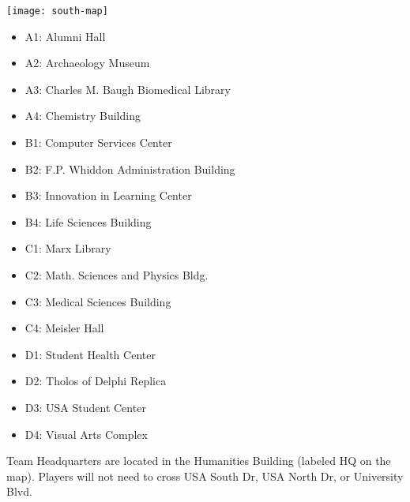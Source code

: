 \documentclass{../puzzlehunt}
\begin{document}


\begin{center}
  \texttt{[image: south-map]}
\end{center}

\begin{multicols}{2}
  \begin{itemize}
    \item A1: Alumni Hall
    \item A2: Archaeology Museum
    \item A3: Charles M. Baugh Biomedical Library
    \item A4: Chemistry Building
    \item B1: Computer Services Center
    \item B2: F.P. Whiddon Administration Building %
    \item B3: Innovation in Learning Center
    \item B4: Life Sciences Building
    \item C1: Marx Library
    \item C2: Math. Sciences and Physics Bldg. 
    \item C3: Medical Sciences Building
    \item C4: Meisler Hall %
    \item D1: Student Health Center
    \item D2: Tholos of Delphi Replica
    \item D3: USA Student Center
    \item D4: Visual Arts Complex
  \end{itemize}
\end{multicols}

Team Headquarters are located in the Humanities
Building (labeled HQ on the map).
Players will not need to cross USA South Dr, USA North Dr, or University Blvd.
\end{document}
